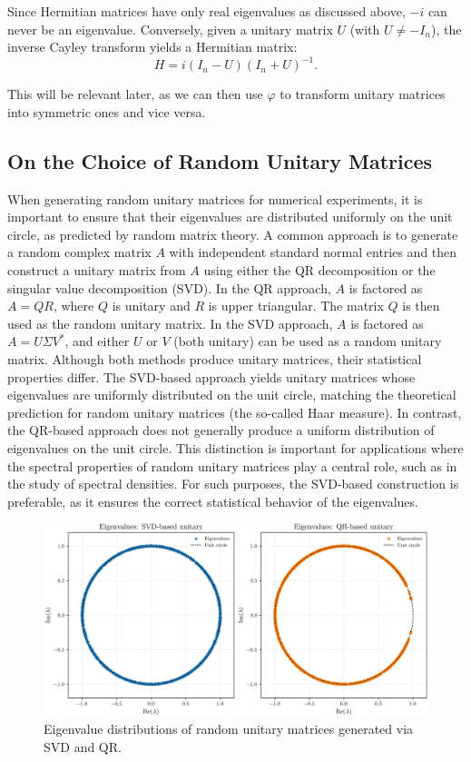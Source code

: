 Since Hermitian matrices have only real eigenvalues as discussed above, $-i$ can never be an eigenvalue.
Conversely, given a unitary matrix $U$ (with $U \neq -I_n$),
the inverse Cayley transform yields a Hermitian matrix:
\[
H = i (I_n - U)(I_n + U)^{-1}.
\]

This will be relevant later, as we can then use $\varphi$ to transform unitary matrices into symmetric ones and vice versa.

\subsection*{On the Choice of Random Unitary Matrices}


When generating random unitary matrices for numerical experiments,
it is important to ensure that their eigenvalues are distributed uniformly on the unit circle,
as predicted by random matrix theory.
A common approach is to generate a random complex matrix $A$ with independent standard normal entries
and then construct a unitary matrix from $A$ using either the QR decomposition or the singular value decomposition (SVD).
In the QR approach, $A$ is factored as $A = QR$, where $Q$ is unitary and $R$ is upper triangular.
The matrix $Q$ is then used as the random unitary matrix.
In the SVD approach, $A$ is factored as $A = U \Sigma V^*$,
and either $U$ or $V$ (both unitary) can be used as a random unitary matrix.
Although both methods produce unitary matrices, their statistical properties differ.
The SVD-based approach yields unitary matrices whose eigenvalues are uniformly distributed on the unit circle,
matching the theoretical prediction for random unitary matrices (the so-called Haar measure).
In contrast, the QR-based approach does not generally produce a uniform distribution of eigenvalues on the unit circle.
This distinction is important for applications where the spectral properties of random unitary matrices play a central role,
such as in the study of spectral densities.
For such purposes, the SVD-based construction is preferable,
as it ensures the correct statistical behavior of the eigenvalues.

\begin{figure}[htb]
    \centering
    \includegraphics[width=1\textwidth]{Graphics/eigenvalue_comparison.png}
    \caption{Eigenvalue distributions of random unitary matrices generated via SVD and QR.}
    \label{fig:eigenvalue-comparison}
\end{figure}

